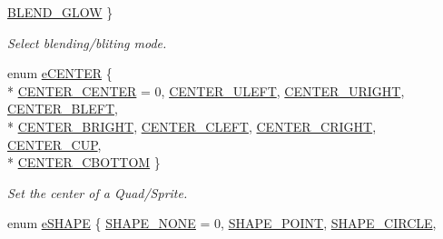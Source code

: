 \begin{DoxyCompactItemize}
\hyperlink{group____enums_ga332b9dbc3141f0555a6deea6cffed74aa9f4b292e8e8256d759b9437ff171d81a}{B\-L\-E\-N\-D\-\_\-\-G\-L\-O\-W}
 \}
\begin{DoxyCompactList}\small\item\em Select blending/bliting mode. \end{DoxyCompactList}\item 
enum \hyperlink{group____enums_gad636335daeba2e91ac70989f808fb628}{e\-C\-E\-N\-T\-E\-R} \{ \\*
\hyperlink{group____enums_gad636335daeba2e91ac70989f808fb628a218b7c64b3c865a3f346072a412aa87a}{C\-E\-N\-T\-E\-R\-\_\-\-C\-E\-N\-T\-E\-R} = 0, 
\hyperlink{group____enums_gad636335daeba2e91ac70989f808fb628a647ee00c6355b8105d0310adb12ba294}{C\-E\-N\-T\-E\-R\-\_\-\-U\-L\-E\-F\-T}, 
\hyperlink{group____enums_gad636335daeba2e91ac70989f808fb628a28081edb72c3b76c3479070b14bcc88d}{C\-E\-N\-T\-E\-R\-\_\-\-U\-R\-I\-G\-H\-T}, 
\hyperlink{group____enums_gad636335daeba2e91ac70989f808fb628a18a74c45fecce3b6cb4c3ccf2b716f75}{C\-E\-N\-T\-E\-R\-\_\-\-B\-L\-E\-F\-T}, 
\\*
\hyperlink{group____enums_gad636335daeba2e91ac70989f808fb628a7f111d76f6ca3634d3d78a729ae84a6c}{C\-E\-N\-T\-E\-R\-\_\-\-B\-R\-I\-G\-H\-T}, 
\hyperlink{group____enums_gad636335daeba2e91ac70989f808fb628ad207137fcf38bbc8700100c894f46ed6}{C\-E\-N\-T\-E\-R\-\_\-\-C\-L\-E\-F\-T}, 
\hyperlink{group____enums_gad636335daeba2e91ac70989f808fb628a1d0c8f0198e6648337c0cd1bbe8eb841}{C\-E\-N\-T\-E\-R\-\_\-\-C\-R\-I\-G\-H\-T}, 
\hyperlink{group____enums_gad636335daeba2e91ac70989f808fb628a89dd51966b8f08b949e24ae2747e6b38}{C\-E\-N\-T\-E\-R\-\_\-\-C\-U\-P}, 
\\*
\hyperlink{group____enums_gad636335daeba2e91ac70989f808fb628aa46c33d4fa916b10dfa1322bbaff2ad7}{C\-E\-N\-T\-E\-R\-\_\-\-C\-B\-O\-T\-T\-O\-M}
 \}
\begin{DoxyCompactList}\small\item\em Set the center of a Quad/\-Sprite. \end{DoxyCompactList}\item 
enum \hyperlink{group____enums_gae0bb4ff64a099c5102636dd24f9bb689}{e\-S\-H\-A\-P\-E} \{ \hyperlink{group____enums_gae0bb4ff64a099c5102636dd24f9bb689a7cd1179e1e28f28bedec532190654441}{S\-H\-A\-P\-E\-\_\-\-N\-O\-N\-E} = 0, 
\hyperlink{group____enums_gae0bb4ff64a099c5102636dd24f9bb689af68f865707acbfd19fcd9bc5d4b5d005}{S\-H\-A\-P\-E\-\_\-\-P\-O\-I\-N\-T}, 
\hyperlink{group____enums_gae0bb4ff64a099c5102636dd24f9bb689a36295af6e5c018f975d6cfdd77bb640e}{S\-H\-A\-P\-E\-\_\-\-C\-I\-R\-C\-L\-E}, 

\end{DoxyCompactItemize}
